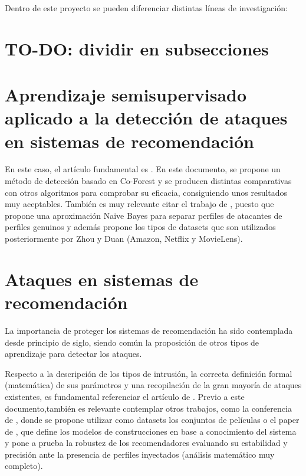 
Dentro de este proyecto se pueden diferenciar distintas líneas de investigación:

\section{TO-DO: dividir en subsecciones}

\section{Aprendizaje semisupervisado aplicado a la detección de ataques en sistemas de recomendación}

En este caso, el artículo fundamental es \cite{zhou2021SemisupervisedRecommendationAttack}. En este documento, se propone un método de detección basado en Co-Forest y se producen distintas comparativas con otros algoritmos para comprobar su eficacia, consiguiendo unos resultados muy aceptables. También es muy relevante citar el trabajo de \cite{zhiang2012HySADNayveBayes}, puesto que propone una aproximación Naive Bayes para separar perfiles de atacantes de perfiles genuinos y además propone los tipos de datasets que son utilizados posteriormente por Zhou y Duan (Amazon, Netflix y MovieLens).

\section{Ataques en sistemas de recomendación}

La importancia de proteger los sistemas de recomendación ha sido contemplada desde principio de siglo, siendo común la proposición de otros tipos de aprendizaje para detectar los ataques.

Respecto a la descripción de los tipos de intrusión, la correcta definición formal (matemática) de sus parámetros y una recopilación de la gran mayoría de ataques existentes, es fundamental referenciar el artículo de \cite{mingdan2020ShillingAttacksAReview}. Previo a este documento,también es relevante contemplar otros trabajos, como la conferencia de \cite{lam2004ShillingRecommender}, donde se propone utilizar como datasets los conjuntos de películas o el paper de \cite{mahony2004CollaborativeRecommendation}, que define los modelos de construcciones en base a conocimiento del sistema y pone a prueba la robustez de los recomendadores evaluando su estabilidad y precisión ante la presencia de perfiles inyectados (análisis matemático muy completo).